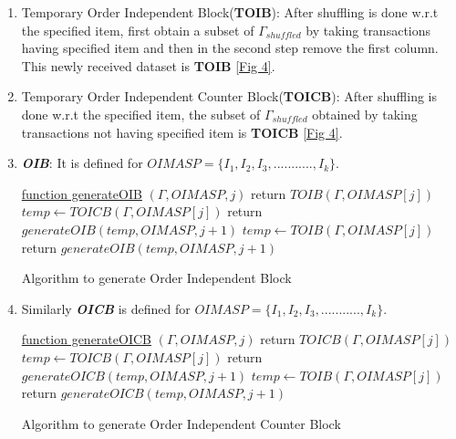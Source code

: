 \documentclass[review]{elsarticle}
\begin{document}
\begin{enumerate}[1.]
\item Temporary Order Independent Block(\textbf{TOIB}): After shuffling is done w.r.t the specified item, first obtain a subset of $ \Gamma _{shuffled} $ by taking transactions having specified item and then in the second step remove the first column. This newly received dataset is \textbf{TOIB} \ref{Fig 4}.

\item Temporary Order Independent Counter Block(\textbf{TOICB}): After shuffling is done w.r.t the specified item, the subset of $ \Gamma _{shuffled} $ obtained by taking transactions not having specified item is \textbf{TOICB} \ref{Fig 4}.

\item \emph{\textbf{OIB}}: It is defined for $ OIMASP = \{I_{1}, I_{2}, I_{3}, ..........., I_{k}\}  $.

\begin{algorithm}

    \underline{function generateOIB} $ (\Gamma, OIMASP, j) $\;
      {
        return $ TOIB(\Gamma, OIMASP[j]) $\;
      }     
      {
        $ temp \leftarrow TOICB(\Gamma, OIMASP[j]) $\;
		return $ generateOIB(temp, OIMASP, j+1) $
      }
      {
		$ temp \leftarrow TOIB(\Gamma, OIMASP[j]) $\;
		return $ generateOIB(temp, OIMASP, j+1) $
      }      
    \caption{Algorithm to generate Order Independent Block}
\end{algorithm}

\item Similarly \emph{\textbf{OICB}} is defined for $ OIMASP = \{I_{1}, I_{2}, I_{3}, ..........., I_{k}\}  $.

\begin{algorithm}

    \underline{function generateOICB} $ (\Gamma, OIMASP, j) $\;
      {
        return $ TOICB(\Gamma, OIMASP[j]) $\;
      }     
      {
        $ temp \leftarrow TOICB(\Gamma, OIMASP[j]) $\;
		return $ generateOICB(temp, OIMASP, j+1) $
      }
      {
		$ temp \leftarrow TOIB(\Gamma, OIMASP[j]) $\;
		return $ generateOICB(temp, OIMASP, j+1) $
      }      
    \caption{Algorithm to generate Order Independent Counter Block}
\end{algorithm}
\end{enumerate}
\end{document}
